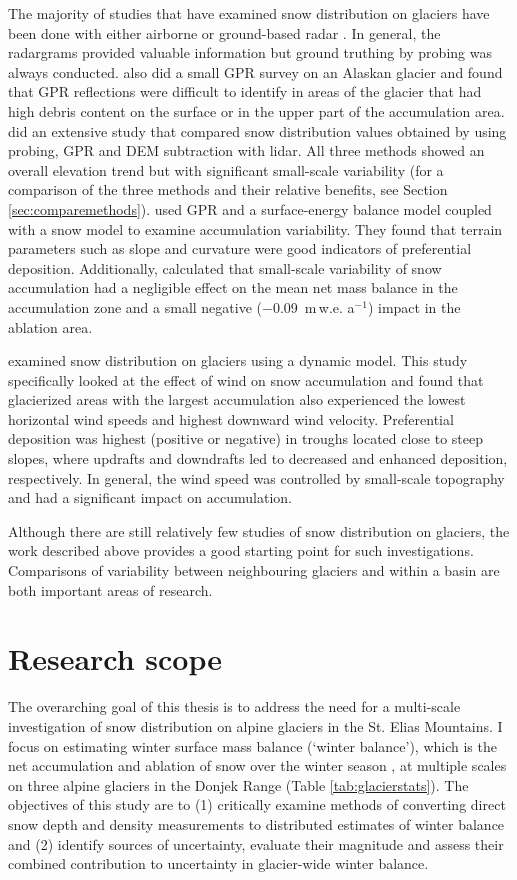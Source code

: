 \documentclass{sfuthesis}
\begin{document}
The majority of studies that have examined snow distribution on glaciers have been done with either airborne or ground-based radar \citep[e.g.][]{Winther1998,Machguth2006, Grabiec2011, Pelt2014,McGrath2015}. In general, the radargrams provided valuable information but ground truthing by probing was always conducted. \cite{Gusmeroli2014} also did a small GPR survey on an Alaskan glacier and found that GPR reflections were difficult to identify in areas of the glacier that had high debris content on the surface or in the upper part of the accumulation area. \cite{Sold2013} did an extensive study that compared snow distribution values obtained by using probing, GPR and DEM subtraction with lidar. All three methods showed an overall elevation trend but with significant small-scale variability (for a comparison of the three methods and their relative benefits, see Section \ref{sec:comparemethods}). \cite{Pelt2014} used GPR and a surface-energy balance model coupled with a snow model to examine accumulation variability. They found that terrain parameters such as slope and curvature were good indicators of preferential deposition. Additionally, \cite{Pelt2014} calculated that small-scale variability of snow accumulation had a negligible effect on the mean net mass balance in the accumulation zone and a small negative ($-$0.09 \,m\,w.e. a$^{-1}$) impact in the ablation area.

\cite{Dadic2010} examined snow distribution on glaciers using a dynamic model. This study specifically looked at the effect of wind on snow accumulation and found that glacierized areas with the largest accumulation also experienced the lowest horizontal wind speeds and highest downward wind velocity. Preferential deposition was highest (positive or negative) in troughs located close to steep slopes, where updrafts and downdrafts led to decreased and enhanced deposition, respectively. In general, the wind speed was controlled by small-scale topography and had a significant impact on accumulation. 

Although there are still relatively few studies of snow distribution on glaciers, the work described above provides a good starting point for such investigations. Comparisons of variability between neighbouring glaciers and within a basin are both important areas of research.

\section{Research scope}
\label{sec:ResearchScope}
The overarching goal of this thesis is to address the need for a multi-scale investigation of snow distribution on alpine glaciers in the St. Elias Mountains. I focus on estimating winter surface mass balance (`winter balance'), which is the net accumulation and ablation of snow over the winter season \citep{Cogley2011}, at multiple scales on three alpine glaciers in the Donjek Range (Table \ref{tab:glacierstats}). The objectives of this study are to (1) critically examine methods of converting direct snow depth and density measurements to distributed estimates of winter balance and (2) identify sources of uncertainty, evaluate their magnitude and assess their combined contribution to uncertainty in glacier-wide winter balance. 
\end{document}
